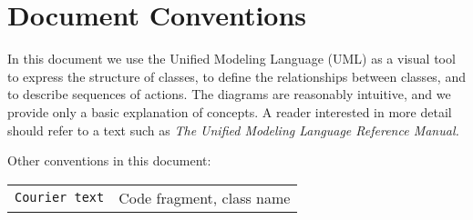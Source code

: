 \section{Document Conventions}
\label{sec:conventions}

In this document we use the Unified Modeling Language (UML) as a visual tool 
to express the structure of 
classes, to define the relationships between classes, and to describe sequences
of actions.  The diagrams are reasonably intuitive, and we provide 
only a basic explanation of concepts.  A reader interested in more detail should 
refer to a text such as {\it The Unified Modeling Language Reference Manual.}

Other conventions in this document: 
\begin{tabular}{ll}
{\tt Courier text} & {Code fragment, class name} \\
\end{tabular}








